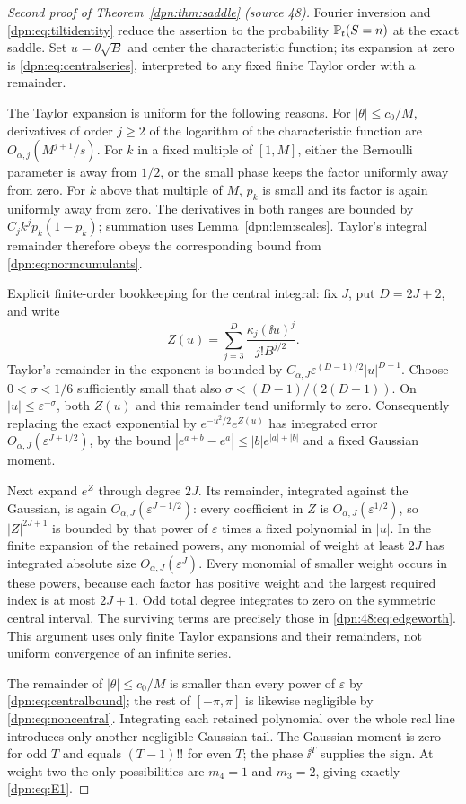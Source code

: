 \documentclass[11pt]{article}
\numberwithin{equation}{section}
\theoremstyle{definition}\newtheorem{definition}[theorem]{Definition}
\theoremstyle{remark}\newtheorem{remark}[theorem]{Remark}
\newcommand{\eps}{\varepsilon}
\newcommand{\src}[1]{\textup{(source #1)}}
\begin{document}
\begin{proof}[Second proof of Theorem~\ref{dpn:thm:saddle} \src{48}]
Fourier inversion and \eqref{dpn:eq:tiltidentity} reduce the assertion to
the probability $\mathbb P_t(S=n)$ at the exact saddle.  Set $u=\theta\sqrt B$
and center the characteristic function; its expansion at zero is
\eqref{dpn:eq:centralseries}, interpreted to any fixed finite Taylor order
with a remainder.

The Taylor expansion is uniform for the following reasons.  For
$|\theta|\le c_0/M$, derivatives of order $j\ge2$ of the logarithm of the
characteristic function are $O_{\alpha,j}(M^{j+1}/s)$.  For $k$ in a fixed
multiple of $[1,M]$, either the Bernoulli parameter is away from $1/2$, or the
small phase keeps the factor uniformly away from zero.  For $k$ above that
multiple of $M$, $p_k$ is small and its factor is again uniformly away from
zero.  The derivatives in both ranges are bounded by $C_jk^jp_k(1-p_k)$;
summation uses Lemma~\ref{dpn:lem:scales}.  Taylor's integral remainder
therefore obeys the corresponding bound from \eqref{dpn:eq:normcumulants}.

Explicit finite-order bookkeeping for the central integral: fix $J$, put
$D=2J+2$, and write
\[
 Z(u)=\sum_{j=3}^{D}\frac{\kappa_j(\ii u)^j}{j!B^{j/2}}.
\]
Taylor's remainder in the exponent is bounded by
$C_{\alpha,J}\eps^{(D-1)/2}|u|^{D+1}$.  Choose $0<\sigma<1/6$ sufficiently
small that also $\sigma<(D-1)/(2(D+1))$.  On $|u|\le\eps^{-\sigma}$, both
$Z(u)$ and this remainder tend uniformly to zero.  Consequently replacing the
exact exponential by $e^{-u^2/2}e^{Z(u)}$ has integrated error
$O_{\alpha,J}(\eps^{J+1/2})$, by the bound $|e^{a+b}-e^a|\le|b|e^{|a|+|b|}$
and a fixed Gaussian moment.

Next expand $e^{Z}$ through degree $2J$.  Its remainder, integrated against
the Gaussian, is again $O_{\alpha,J}(\eps^{J+1/2})$: every coefficient in $Z$
is $O_{\alpha,J}(\eps^{1/2})$, so $|Z|^{2J+1}$ is bounded by that power of
$\eps$ times a fixed polynomial in $|u|$.  In the finite expansion of the
retained powers, any monomial of weight at least $2J$ has integrated absolute
size $O_{\alpha,J}(\eps^J)$.  Every monomial of smaller weight occurs in these
powers, because each factor has positive weight and the largest required
index is at most $2J+1$.  Odd total degree integrates to zero on the symmetric
central interval.  The surviving terms are precisely those in
\eqref{dpn:48:eq:edgeworth}.  This argument uses only finite Taylor expansions
and their remainders, not uniform convergence of an infinite series.

The remainder of $|\theta|\le c_0/M$ is smaller than every power of $\eps$ by
\eqref{dpn:eq:centralbound}; the rest of $[-\pi,\pi]$ is likewise negligible
by \eqref{dpn:eq:noncentral}.  Integrating each retained polynomial over the
whole real line introduces only another negligible Gaussian tail.  The
Gaussian moment is zero for odd $T$ and equals $(T-1)!!$ for even $T$; the
phase $\ii^T$ supplies the sign.  At weight two the only possibilities are
$m_4=1$ and $m_3=2$, giving exactly \eqref{dpn:eq:E1}.
\end{proof}
\end{document}
